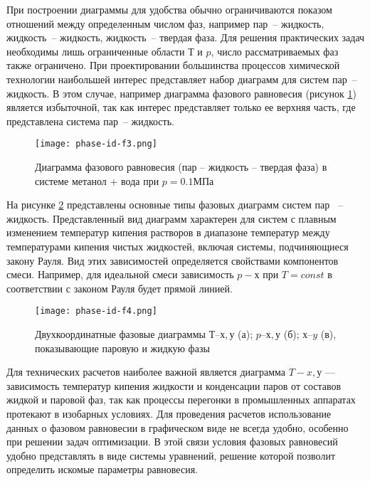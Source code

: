 При построении диаграммы для удобства обычно ограничиваются показом отношений между определенным числом фаз, например пар~-- жидкость, жидкость~-- жидкость, жидкость~-- твердая фаза. Для решения практических задач необходимы лишь ограниченные области $Т$ и $p$, число рассматриваемых фаз также ограничено. При проектировании большинства процессов химической технологии наибольшей интерес представляет набор диаграмм для систем пар~-- жидкость. В этом случае, например диаграмма фазового равновесия (рисунок \ref{fig:phase-id.f3}) является избыточной, так как интерес представляет только ее верхняя часть, где представлена система пар~-- жидкость. 

\begin{figure}
	\begin{center}
		\texttt{[image: phase-id-f3.png]}
	\end{center}
	\caption{Диаграмма фазового равновесия (пар – жидкость – твердая фаза) в системе метанол + вода при $p = 0.1 МПа$} \label{fig:phase-id.f3}
\end{figure}

На рисунке \ref{fig:phase-id.f4} представлены основные типы фазовых диаграмм систем пар ~-- жидкость. Представленный вид диаграмм характерен для систем с плавным изменением температур кипения растворов в диапазоне температур между температурами кипения чистых жидкостей, включая системы, подчиняющиеся закону Рауля. Вид этих зависимостей определяется свойствами компонентов смеси. Например, для идеальной смеси зависимость $p-х$ при $T=const$ в соответствии с законом Рауля будет прямой линией.

\begin{figure}
	\begin{center}
		\texttt{[image: phase-id-f4.png]}
	\end{center}
	\caption{Двухкоординатные фазовые диаграммы $Т – х, у$ (а); $p – х, у$ (б); $х – y$ (в), показывающие паровую и жидкую фазы} \label{fig:phase-id.f4}
\end{figure}

Для технических расчетов наиболее важной является диаграмма $T-x, у$ --- зависимость температур кипения жидкости и конденсации паров от составов жидкой и паровой фаз, так как процессы перегонки в промышленных аппаратах протекают в изобарных условиях. Для проведения расчетов использование данных о фазовом равновесии в графическом виде не всегда удобно, особенно при решении задач оптимизации. В этой связи условия фазовых равновесий удобно представлять в виде системы уравнений, решение которой позволит определить искомые параметры равновесия. 



